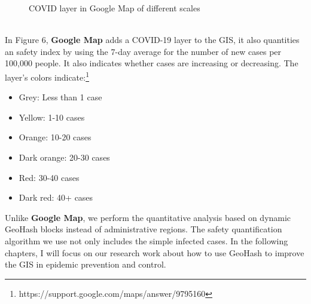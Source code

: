 \documentclass[sigplan,screen]{acmart}
\begin{document}
\begin{figure}[htb]
	\centering
	\caption{COVID layer in Google Map of different scales}
\end{figure}
\\
In Figure 6, \textbf{Google Map} adds a COVID-19 layer to the GIS, it also quantities an safety index by using the 7-day average for the number of new cases per 100,000 people.
It also indicates whether cases are increasing or decreasing.
The layer's colors indicate:\footnote{https://support.google.com/maps/answer/9795160}
\begin{itemize}
	\item Grey: Less than 1 case
	\item Yellow: 1-10 cases
	\item Orange: 10-20 cases
	\item Dark orange: 20-30 cases
	\item Red: 30-40 cases
	\item Dark red: 40+ cases
\end{itemize}
Unlike \textbf{Google Map}, we perform the quantitative analysis based on dynamic GeoHash blocks instead of administrative regions.
The safety quantification algorithm we use not only includes the simple infected cases.
In the following chapters, I will focus on our research work about how to use GeoHash to improve the GIS in epidemic prevention and control.
\end{document}
